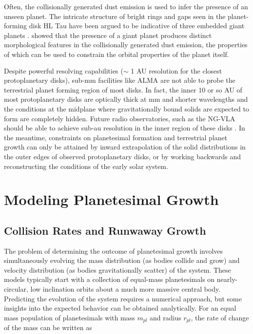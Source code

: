 Often, the collisionally generated dust emission is used to infer the presence of an unseen planet. The intricate structure of bright rings and gaps seen in the planet-forming disk HL Tau \cite{alma15} have been argued to be indicative of three embedded giant planets \cite{boley17}. \cite{dobinson13, dobinson16} showed that the presence of a giant planet produces distinct morphological features in the collisionally generated dust emission, the properties of which can be used to constrain the orbital properties of the planet itself.

Despite powerful resolving capabilities ($\sim$ 1 AU resolution for the closest protoplanetary disks), sub-mm facilities like ALMA are not able to probe the terrestrial planet forming region of most disks. In fact, the inner 10 or so AU of most protoplanetary disks are optically thick at mm and shorter wavelengths \cite{beckwith90} and the conditions at the midplane where gravitationally bound solids are expected to form are completely hidden. Future radio observatories, such as the NG-VLA should be able to achieve sub-au resolution in the inner region of these disks \cite{ricci20}. In the meantime, constraints on planetesimal formation and terrestrial planet growth can only be attained by inward extrapolation of the solid distributions in the outer edges of observed protoplanetary disks, or by working backwards and reconstructing the conditions of the early solar system.

\section{Modeling Planetesimal Growth}

\subsection{Collision Rates and Runwaway Growth}

The problem of determining the outcome of planetesimal growth involves simultaneously evolving the mass distribution (as bodies collide and grow) and velocity distribution (as bodies gravitationally scatter) of the system. These models typically start with a collection of equal-mass planetesimals on nearly-circular, low inclination orbits about a much more massive central body. Predicting the evolution of the system requires a numerical approach, but some insights into the expected behavior can be obtained analytically. For an equal mass population of planetesimals with mass $m_{pl}$ and radius $r_{pl}$, the rate of change of the mass can be written as

